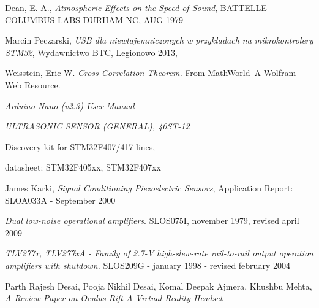 \begin{thebibliography}{99}


    Dean, E. A., \textit{Atmospheric Effects on the Speed of Sound}, BATTELLE COLUMBUS LABS DURHAM NC, AUG 1979

   Marcin Peczarski, 
  \textit{USB dla niewtajemniczonych w przykładach na mikrokontrolery STM32}, Wydawnictwo BTC, Legionowo 2013,

   Weisstein, Eric W. \textit{Cross-Correlation Theorem.} From MathWorld--A Wolfram Web Resource. 

  \textit{Arduino Nano (v2.3) User Manual}
  
  \textit{ULTRASONIC SENSOR (GENERAL), 40ST-12}

   Discovery kit for STM32F407/417 lines,

   datasheet: STM32F405xx, STM32F407xx 
  
   James Karki, \textit{Signal Conditioning Piezoelectric Sensors}, 
  Application Report: SLOA033A - September 2000

   \textit{Dual low-noise operational amplifiers}. SLOS075I, november 1979, revised april 2009

   \textit{TLV277x, TLV277xA - Family of 2.7-V high-slew-rate rail-to-rail output operation amplifiers with shutdown.}
  SLOS209G - january 1998 - revised february 2004

  
    Parth Rajesh Desai, Pooja Nikhil Desai, Komal Deepak Ajmera, Khushbu Mehta,
  \textit{A Review Paper on Oculus Rift-A Virtual Reality Headset}


\end{thebibliography}

